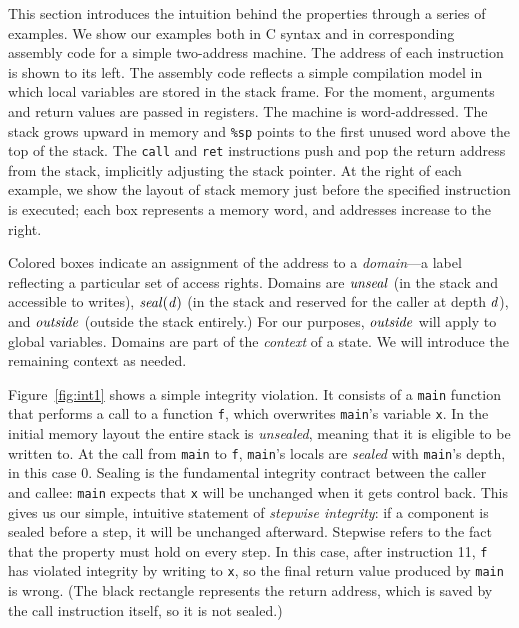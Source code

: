 \documentclass[acmsmall,review,anonymous]{acmart}\settopmatter{printfolios=true,printccs=false,printacmref=false}
\begin{document}
This section introduces the intuition behind the properties through a series
of examples. We show our examples both in C syntax and in corresponding assembly code for a
simple two-address machine. The address of each instruction is shown to its left.
The assembly code reflects a simple compilation model in which
local variables are stored in the stack frame.
For the moment, arguments and return values are passed in registers.
The machine is word-addressed. The stack grows upward in
memory and {\tt \%sp} points to the first unused word above the top of the stack.
The {\tt call} and {\tt ret} instructions push and pop the return address from the stack,
implicitly adjusting the stack pointer.
At the right of each example, we show the layout of stack memory just before
the specified instruction is executed; each box represents a memory word, and
addresses increase to the right.

Colored boxes indicate an assignment of the address to a
{\em domain}---a label reflecting a particular set of access rights. Domains
are \(\mathit{unseal}\) (in the stack and accessible to writes), \(\mathit{seal(d)}\)
(in the stack and reserved for the caller at depth \(d\)), and \(\mathit{outside}\)
(outside the stack entirely.) For our purposes, \(\mathit{outside}\) will apply to global
variables. Domains are part of the {\em context} of a state.
We will introduce the remaining context as needed.

Figure~\ref{fig:int1} shows a simple integrity violation. It consists of a {\tt main}
function that performs a call to a function {\tt f}, which overwrites {\tt main}'s
variable {\tt x}. In the initial memory layout the entire stack is {\em unsealed},
meaning that it is eligible to be written to. At the call from {\tt main} to
{\tt f}, {\tt main}'s locals are {\em sealed} with {\tt main}'s depth,
in this case 0. Sealing is the fundamental integrity contract between the caller and callee:
{\tt main} expects that {\tt x} will be unchanged when it gets control back.
This gives us our simple, intuitive statement of {\em stepwise integrity}:
if a component is sealed before a step, it will be unchanged afterward. Stepwise
refers to the fact that the property must hold on every step. %
In this case, after instruction 11, {\tt f} has violated integrity by writing to {\tt x},
so the final return value produced by {\tt main} is wrong.
%
(The black rectangle represents the return address, which is saved by the call
instruction itself, so it is not sealed.)
\end{document}
